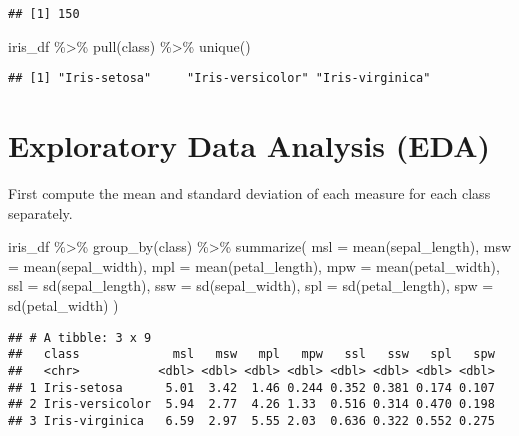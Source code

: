 \documentclass[
  oneside]{book}
\newenvironment{Shaded}{\begin{snugshade}}{\end{snugshade}}
\newcommand{\AttributeTok}[1]{\textcolor[rgb]{0.77,0.63,0.00}{#1}}
\newcommand{\FunctionTok}[1]{\textcolor[rgb]{0.00,0.00,0.00}{#1}}
\newcommand{\NormalTok}[1]{#1}
\newcommand{\SpecialCharTok}[1]{\textcolor[rgb]{0.00,0.00,0.00}{#1}}
\begin{document}
\begin{verbatim}
## [1] 150
\end{verbatim}

\begin{Shaded}
\begin{Highlighting}[]
\NormalTok{iris\_df }\SpecialCharTok{\%\textgreater{}\%}
  \FunctionTok{pull}\NormalTok{(class) }\SpecialCharTok{\%\textgreater{}\%}
  \FunctionTok{unique}\NormalTok{()}
\end{Highlighting}
\end{Shaded}

\begin{verbatim}
## [1] "Iris-setosa"     "Iris-versicolor" "Iris-virginica"
\end{verbatim}

\hypertarget{exploratory-data-analysis-eda}{%
\section{Exploratory Data Analysis (EDA)}\label{exploratory-data-analysis-eda}}

First compute the mean and standard deviation of each measure for each
class separately.

\begin{Shaded}
\begin{Highlighting}[]
\NormalTok{iris\_df }\SpecialCharTok{\%\textgreater{}\%}
  \FunctionTok{group\_by}\NormalTok{(class) }\SpecialCharTok{\%\textgreater{}\%}
  \FunctionTok{summarize}\NormalTok{(}
    \AttributeTok{msl =} \FunctionTok{mean}\NormalTok{(sepal\_length), }\AttributeTok{msw =} \FunctionTok{mean}\NormalTok{(sepal\_width),}
    \AttributeTok{mpl =} \FunctionTok{mean}\NormalTok{(petal\_length), }\AttributeTok{mpw =} \FunctionTok{mean}\NormalTok{(petal\_width),}
    \AttributeTok{ssl =} \FunctionTok{sd}\NormalTok{(sepal\_length), }\AttributeTok{ssw =} \FunctionTok{sd}\NormalTok{(sepal\_width),}
    \AttributeTok{spl =} \FunctionTok{sd}\NormalTok{(petal\_length), }\AttributeTok{spw =} \FunctionTok{sd}\NormalTok{(petal\_width)}
\NormalTok{  )}
\end{Highlighting}
\end{Shaded}

\begin{verbatim}
## # A tibble: 3 x 9
##   class             msl   msw   mpl   mpw   ssl   ssw   spl   spw
##   <chr>           <dbl> <dbl> <dbl> <dbl> <dbl> <dbl> <dbl> <dbl>
## 1 Iris-setosa      5.01  3.42  1.46 0.244 0.352 0.381 0.174 0.107
## 2 Iris-versicolor  5.94  2.77  4.26 1.33  0.516 0.314 0.470 0.198
## 3 Iris-virginica   6.59  2.97  5.55 2.03  0.636 0.322 0.552 0.275
\end{verbatim}
\end{document}
